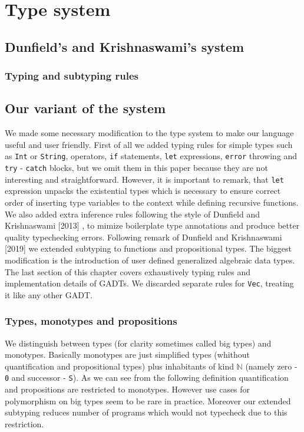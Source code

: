 \documentclass[declaration,shortabstract,english]{iithesis}
\begin{document}
\chapter{Type system}
\section{Dunfield's and Krishnaswami's system}

\subsection*{Typing and subtyping rules}

\section{Our variant of the system}
We made some necessary modification to the type system to make our language useful and user friendly.
First of all we added typing rules for simple types such as
\verb+Int+ or \verb+String+, operators, \verb+if+ statements, \verb+let+ expressions,
\verb+error+ throwing and \verb+try+ - \verb+catch+ blocks, but we omit them in this paper because
they are not interesting and straightforward. However, it is important to remark, that \verb+let+ expression unpacks the
existential types which is necessary to ensure correct order of inserting type variables to the context while defining
recursive functions. We also added extra inference rules following the style of Dunfield and Krishnaswami [2013] \cite{Dunfield13:bidir},
to mimize boilerplate type annotations and produce better quality typechecking errors. Following
remark of Dunfield and Krishnaswami [2019] \cite{gadt-popl19} we extended subtyping to functions and propositional types.
The biggest modification is the introduction of user defined generalized algebraic data types. The last section
of this chapter covers exhaustively typing rules and implementation details of GADTs. We discarded separate rules for
\verb+Vec+, treating it like any other GADT.

\subsection*{Types, monotypes and propositions}

We distinguish between types (for clarity sometimes called big types) and monotypes.
Basically monotypes are just simplified types (whithout quantification and propositional types) plus
inhabitants of kind $\mathbb{N}$ (namely zero - \verb+0+ and successor - \verb+S+).
As we can see from the following definition quantification and propositions are restricted to monotypes.
However use cases for polymorphism on big types seem to be rare in practice. Moreover our extended subtyping
reduces number of programs which would not typecheck due to this restriction.
\end{document}

